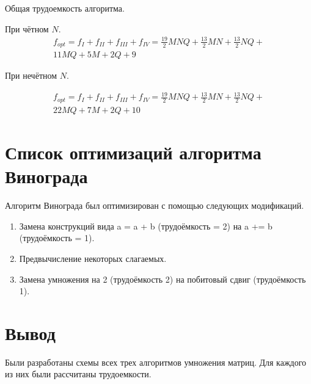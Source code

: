 Общая трудоемкость алгоритма.

	При чётном $N$.
	\begin{equation}
		\label{complex_vin_even}
		\begin{array}{cc}
			f_{opt} = f_{I} + f_{II} + f_{III} + f_{IV} = \frac{19}{2}MNQ + \frac{13}{2}MN + \frac{13}{2}NQ +\\ 11MQ + 5M + 2Q + 9
		\end{array}
	\end{equation}

	При нечётном $N$.
	
	\begin{equation}
		\label{complex_vin_odd}
		\begin{array}{cc}
			f_{opt} = f_{I} + f_{II} + f_{III} + f_{IV} = \frac{19}{2}MNQ + \frac{13}{2}MN + \frac{13}{2}NQ +\\ 22MQ + 7M + 2Q + 10
		\end{array}
	\end{equation}

\section{Список оптимизаций алгоритма Винограда}
Алгоритм Винограда был оптимизирован с помощью следующих модификаций.
\begin{enumerate}
	\item Замена конструкций вида a = a + b (трудоёмкость = 2) на a += b (трудоёмкость = 1).
	\item Предвычисление некоторых слагаемых.
	\item Замена умножения на 2 (трудоёмкость 2) на побитовый сдвиг (трудоёмкость 1).
\end{enumerate}

\section*{Вывод}

Были разработаны схемы всех трех алгоритмов умножения матриц. Для каждого из них были рассчитаны трудоемкости.


